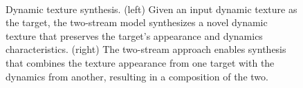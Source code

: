 \begin{figure}[t]
\begin{center}
	\\
	\caption[Dynamic texture synthesis]{Dynamic texture synthesis. (left) Given an input dynamic texture as the target, the two-stream model synthesizes a novel dynamic texture that preserves the target's appearance and dynamics characteristics. (right) The two-stream approach enables synthesis that combines the texture appearance from one target with the dynamics from another, resulting in a composition of the two.}
	\vspace{-0.65cm}
	\label{fig:teaser}
\end{center}
\end{figure}